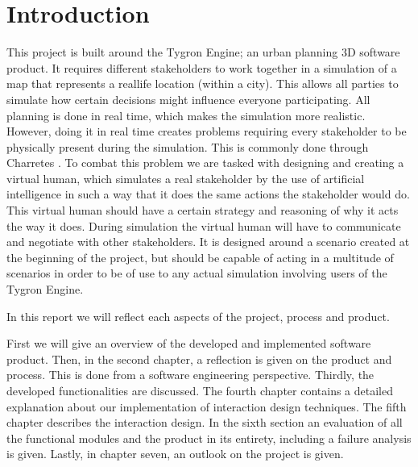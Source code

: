 \section{Introduction}

This project is built around the Tygron Engine; an urban planning 3D software product. It requires different stakeholders to work together in a simulation of a map that represents a reallife location (within a city). This allows all parties to simulate how certain decisions might influence everyone participating. All planning is done in real time, which makes the simulation more realistic. However, doing it in real time creates problems requiring every stakeholder to be physically present during the simulation. This is commonly done through Charretes \cite{Todd13}. To combat this problem we are tasked with designing and creating a virtual human, which simulates a real stakeholder by the use of artificial intelligence in such a way that it does the same actions the stakeholder would do. This virtual human should have a certain strategy and reasoning of why it acts the way it does. During simulation the virtual human will have to communicate and negotiate with other stakeholders. It is designed around a scenario created at the beginning of the project, but should be capable of acting in a multitude of scenarios in order to be of use to any actual simulation involving users of the Tygron Engine.

In this report we will reflect each aspects of the project, process and product.

First we will give an overview of the developed and implemented software product. Then, in the second chapter, a reflection is given on the product and process. This is done from a software engineering perspective. Thirdly, the developed functionalities are discussed. The fourth chapter contains a detailed explanation about our implementation of interaction design techniques. The fifth chapter describes the interaction design. In the sixth section an evaluation of all the functional modules and the product in its entirety, including a failure analysis is given. Lastly, in chapter seven, an outlook on the project is given.

